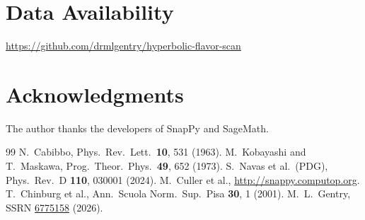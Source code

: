 \documentclass[11pt,a4paper]{article}
\begin{document}
\section*{Data Availability}
\url{https://github.com/drmlgentry/hyperbolic-flavor-scan}

\section*{Acknowledgments}
The author thanks the developers of SnapPy and SageMath.

\begin{thebibliography}{99}
N.~Cabibbo, Phys.\ Rev.\ Lett.\ \textbf{10}, 531 (1963).
M.~Kobayashi and T.~Maskawa, Prog.\ Theor.\ Phys.\ \textbf{49}, 652 (1973).
S.~Navas et al.\ (PDG), Phys.\ Rev.\ D \textbf{110}, 030001 (2024).
M.~Culler et al., \url{http://snappy.computop.org}.
T.~Chinburg et al., Ann.\ Scuola Norm.\ Sup.\ Pisa \textbf{30}, 1 (2001).
M.~L.~Gentry, SSRN \href{https://doi.org/10.2139/ssrn.6775158}{6775158} (2026).
\end{thebibliography}
\end{document}
